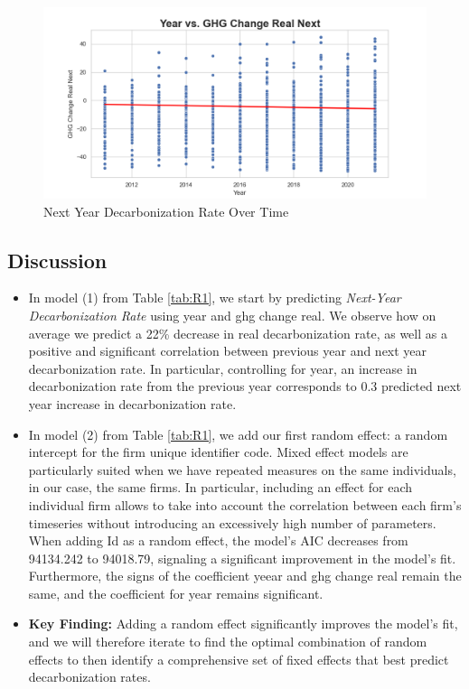 \begin{figure}[H]
\centering
  \includegraphics[width=\textwidth]{figures/year_vs_ghg_change_real_next.png}
\caption{Next Year Decarbonization Rate Over Time}
\label{fig:ghg_change_real_vs_year}
\end{figure}

    


\subsection{Discussion}
\begin{itemize}
    \item In model (1) from Table \ref{tab:R1}, we start by predicting \textit{Next-Year Decarbonization Rate} using year and ghg change real. We observe how on average we predict a 22\% decrease in real decarbonization rate, as well as a positive and significant correlation between previous year and next year decarbonization rate. In particular, controlling for year, an increase in decarbonization rate from the previous year corresponds to 0.3 predicted next year increase in decarbonization rate. 
    \item In model (2) from Table \ref{tab:R1}, we add our first random effect: a random intercept for the firm unique identifier code. Mixed effect models are particularly suited when we have repeated measures on the same individuals, in our case, the same firms. In particular, including an effect for each individual firm allows to take into account the correlation between each firm's timeseries without introducing an excessively high number of parameters. When adding Id as a random effect, the model's AIC decreases from 94134.242 to 94018.79, signaling a significant improvement in the model's fit. Furthermore, the signs of the coefficient yeear and ghg change real remain the same, and the coefficient for year remains significant. 
    \item \textbf{Key Finding:} Adding a random effect significantly improves the model's fit, and we will therefore iterate to find the optimal combination of random effects to then identify a comprehensive set of fixed effects that best predict decarbonization rates. 
\end{itemize}






